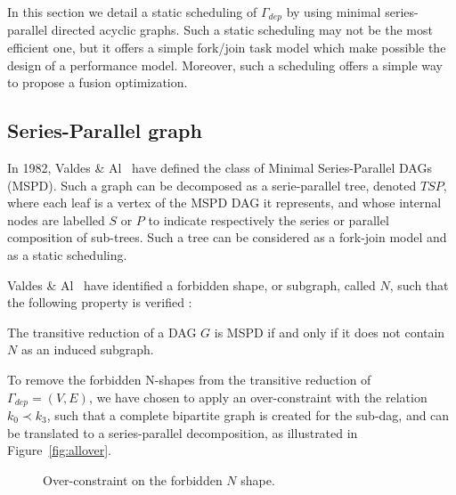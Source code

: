 
In this section we detail a static scheduling of $\Gamma_{dep}$ by using minimal series-parallel directed acyclic graphs. Such a static scheduling may not be the most efficient one, but it offers a simple fork/join task model which make possible the design of a performance model. Moreover, such a scheduling offers a simple way to propose a fusion optimization. 

\subsection{Series-Parallel graph}
\label{sect:tsp}

In 1982, Valdes \& Al~\cite{Valdes:1979:RSP:800135.804393} have defined the class of Minimal Series-Parallel DAGs (MSPD). Such a graph can be decomposed as a serie-parallel tree, denoted $TSP$, where each leaf is a vertex of the MSPD DAG it represents, and whose internal nodes are labelled $S$ or $P$ to indicate respectively the series or parallel composition of sub-trees. Such a tree can be considered as a fork-join model and as a static scheduling.

Valdes \& Al~\cite{Valdes:1979:RSP:800135.804393} have identified a forbidden shape, or subgraph, called $N$, such that the following property is verified :

\begin{myth}
The transitive reduction of a DAG $G$ is MSPD if and only if it does not contain $N$ as an induced subgraph.
\end{myth}

To remove the forbidden N-shapes from the transitive reduction of $\Gamma_{dep}=(V,E)$, we have chosen to apply an over-constraint with the relation $k_0 \prec k_3$, such that a complete bipartite graph is created for the sub-dag, and can be translated to a series-parallel decomposition, as illustrated in Figure~\ref{fig:allover}.

\begin{figure}[h!]
\begin{center}
\caption{Over-constraint on the forbidden $N$ shape.}
\label{fig:over}
\end{center}
\end{figure}

